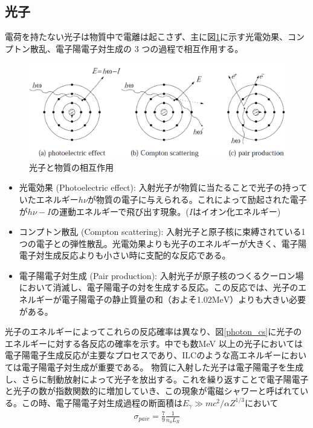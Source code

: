 \subsection{光子}
電荷を持たない光子は物質中で電離は起こさず、主に図\ref{photon}に示す光電効果、コンプトン散乱、電子陽電子対生成の 3 つの過程で相互作用する。
\begin{figure}[H]
	\begin{center}
 \includegraphics[keepaspectratio, scale =0.2]
 	{Figure/Siwecal/photon.png}
 		\caption{光子と物質の相互作用}
 		\label{photon}
	\end{center}
 \end{figure}
\begin{itemize}
 \item 光電効果 (Photoelectric effect): 入射光子が物質に当たることで光子の持っていたエネルギー$h\nu$が物質の電子に与えられる。これによって励起された電子が$h\nu - I$の運動エネルギーで飛び出す現象。($I$はイオン化エネルギー)
 \item コンプトン散乱 (Compton scattering): 入射光子と原子核に束縛されている1つの電子との弾性散乱。光電効果よりも光子のエネルギーが大きく、電子陽電子対生成反応よりも小さい時に支配的な反応である。
 \item 電子陽電子対生成 (Pair production): 入射光子が原子核のつくるクーロン場において消滅し、電子陽電子の対を生成する反応。この反応では、光子のエネルギーが電子陽電子の静止質量の和（およそ1.02$\mathrm{MeV}$）よりも大きい必要がある。
\end{itemize} 
 光子のエネルギーによってこれらの反応確率は異なり、図\ref{photon_cs}に光子のエネルギーに対する各反応の確率を示す。中でも数MeV 以上の光子においては電子陽電子生成反応が主要なプロセスであり、ILCのような高エネルギーにおいては電子陽電子対生成が重要である。 物質に入射した光子は電子陽電子を生成し、さらに制動放射によって光子を放出する。これを繰り返すことで電子陽電子と光子の数が指数関数的に増加していき、この現象が電磁シャワーと呼ばれている。この時、電子陽電子対生成過程の断面積は$E_\gamma \gg mc^2/ \alpha Z^{1/3}$において
 \begin{align}
 \sigma_{pair} = \frac{7}{9}\frac{1}{n_a L_R}
 \end{align}
